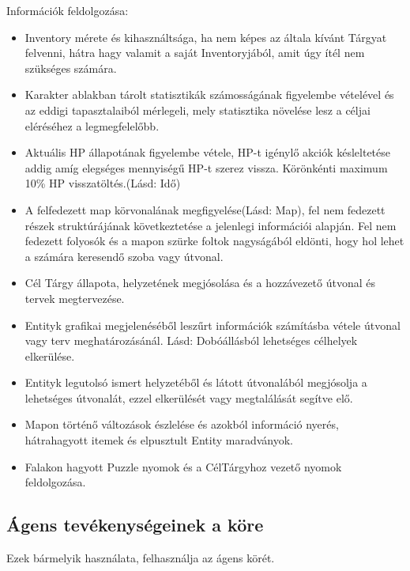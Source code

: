 \noindent Információk feldolgozása:
\begin{itemize}
    \item Inventory mérete és kihasználtsága, ha nem képes az általa kívánt Tárgyat felvenni, hátra hagy valamit a saját Inventoryjából, amit úgy ítél nem szükséges számára.
    \item Karakter ablakban tárolt statisztikák számosságának figyelembe vételével és az eddigi tapasztalaiból mérlegeli, mely statisztika növelése lesz a céljai eléréséhez a legmegfelelőbb.
    \item Aktuális HP állapotának figyelembe vétele, HP-t igénylő akciók késleltetése addig amíg elegséges mennyiségű HP-t szerez vissza. Körönkénti maximum 10\% HP visszatöltés.(Lásd: Idő)
    \item A felfedezett map körvonalának megfigyelése(Lásd: Map), fel nem fedezett részek struktúrájának következtetése a jelenlegi információi alapján. Fel nem fedezett folyosók és a mapon szürke foltok nagyságából eldönti, hogy hol lehet a számára keresendő szoba vagy útvonal.
    \item Cél Tárgy állapota, helyzetének megjósolása és a hozzávezető útvonal és tervek megtervezése.
    \item Entityk grafikai megjelenéséből leszűrt információk számításba vétele útvonal vagy terv meghatározásánál. Lásd: Dobóállásból lehetséges célhelyek elkerülése.
    \item Entityk legutolsó ismert helyzetéből és látott útvonalából megjósolja a lehetséges útvonalát, ezzel elkerülését vagy megtalálását segítve elő.
    \item Mapon történő változások észlelése és azokból információ nyerés, hátrahagyott itemek és elpusztult Entity maradványok.
    \item Falakon hagyott Puzzle nyomok és a CélTárgyhoz vezető nyomok feldolgozása.
\end{itemize}

\subsection{Ágens tevékenységeinek a köre}

\noindent Ezek bármelyik használata, felhasználja az ágens körét.

